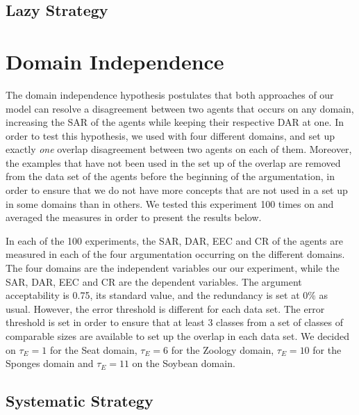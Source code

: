\subsection{Lazy Strategy}

\section{Domain Independence}

The domain independence hypothesis postulates that both approaches of our model can resolve a disagreement between two agents that occurs on any domain, increasing the SAR of the agents while keeping their respective DAR at one. In order to test this hypothesis, we used with four different domains, and set up exactly \emph{one} overlap disagreement between two agents on each of them. Moreover, the examples that have not been used in the set up of the overlap are removed from the data set of the agents before the beginning of the argumentation, in order to ensure that we do not have more concepts that are not used in a set up in some domains than in others. We tested this experiment 100 times on and averaged the measures in order to present the results below. 

In each of the 100 experiments, the SAR, DAR, EEC and CR of the agents are measured in each of the four argumentation occurring on the different domains. The four domains are the independent variables our our experiment, while the SAR, DAR, EEC and CR are the dependent variables. The argument acceptability is 0.75, its standard value, and the redundancy is set at $0\%$ as usual. However, the error threshold is different for each data set. The error threshold is set in order to ensure that at least 3 classes from a set of classes of comparable sizes are available to set up the overlap in each data set. We decided on $\tau_{E} = 1$ for the Seat domain, $\tau_{E} = 6$ for the Zoology domain, $\tau_{E} = 10$ for the Sponges domain and $\tau_{E} = 11$ on the Soybean domain.

\subsection{Systematic Strategy}


